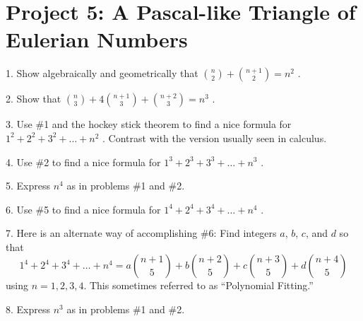 \documentclass[10pt,]{book}
\theoremstyle{plain}
\theoremstyle{definition}
\theoremstyle{definition}
\numberwithin{equation}{chapter}
\begin{document}
\section[{Project 5: A Pascal-like Triangle of Eulerian Numbers}]{Project 5: A Pascal-like Triangle of Eulerian Numbers}\label{exercises-9}
\begin{exerciselist}
\item[1.]\hypertarget{exercise-99}{}\hypertarget{p-239}{}%
Show algebraically and geometrically that \(\binom{n}{2}
+
\binom{n + 1}{2}
= n^{2}\) .%
\par\smallskip
\item[2.]\hypertarget{exercise-100}{}\hypertarget{p-240}{}%
Show that \(\binom{n}{3}
+ 4
\binom{n + 1}{3}
+
\binom{n + 2}{3}
= n^{3}\) .%
\par\smallskip
\item[3.]\hypertarget{exercise-101}{}\hypertarget{p-241}{}%
Use \#1 and the hockey stick theorem to find a nice formula for \(1^{2} + 2^{2} + 3^{2} + \ldots + n^{2}\) . Contrast with the version usually seen in calculus.%
\par\smallskip
\item[4.]\hypertarget{exercise-102}{}\hypertarget{p-242}{}%
Use \#2 to find a nice formula for \(1^{3} + 2^{3} + 3^{3} + \ldots + n^{3}\) .%
\par\smallskip
\item[5.]\hypertarget{exercise-103}{}\hypertarget{p-243}{}%
Express \(n^{4}\) as in problems \#1 and \#2.%
\par\smallskip
\item[6.]\hypertarget{exercise-104}{}\hypertarget{p-244}{}%
Use \#5 to find a nice formula for \(1^{4} + 2^{4} + 3^{4} + \ldots + n^{4}\) .%
\par\smallskip
\item[7.]\hypertarget{exercise-105}{}\hypertarget{p-245}{}%
Here is an alternate way of accomplishing \#6:  Find integers \(a\), \(b\), \(c\), and \(d\) so that%
\begin{equation*}
1^{4} + 2^{4} + 3^{4} + \ldots + n^{4} = a\binom{n + 1}{5}  + b\binom{n + 2}{5}  + c\binom{n + 3}{5}  + d\binom{n + 4}{5}
\end{equation*}
using \(n=1, 2, 3, 4\). This sometimes referred to as ``Polynomial Fitting.''%
\par\smallskip
\item[8.]\hypertarget{exercise-106}{}\hypertarget{p-246}{}%
Express \(n^{3}\) as in problems \#1 and \#2.%
\par\smallskip

\end{exerciselist}
\end{document}
